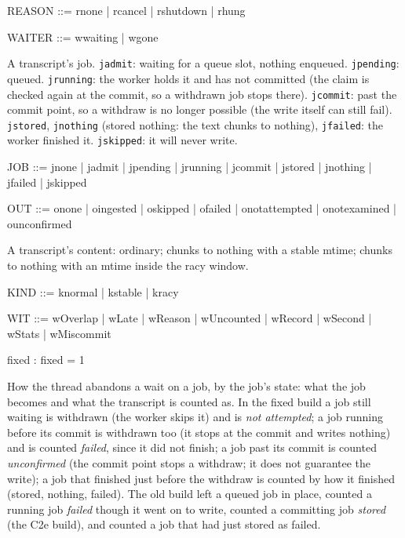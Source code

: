 \documentclass[a4paper,10pt,fleqn]{article}
\newcommand{\field}[1]{\texttt{#1}}
\begin{document}
\begin{zed}
REASON ::= rnone | rcancel | rshutdown | rhung
\end{zed}

\begin{zed}
WAITER ::= wwaiting | wgone
\end{zed}

A transcript's job. \field{jadmit}: waiting for a queue slot, nothing enqueued.
\field{jpending}: queued. \field{jrunning}: the worker holds it and has not
committed (the claim is checked again at the commit, so a withdrawn job stops
there). \field{jcommit}: past the commit point, so a withdraw is no longer possible
(the write itself can still fail).
\field{jstored}, \field{jnothing} (stored nothing: the text chunks to nothing),
\field{jfailed}: the worker finished it. \field{jskipped}: it will never write.

\begin{zed}
JOB ::= jnone | jadmit | jpending | jrunning
      | jcommit | jstored | jnothing | jfailed | jskipped
\end{zed}

\begin{zed}
OUT ::= onone | oingested | oskipped | ofailed | onotattempted | onotexamined
    | ounconfirmed
\end{zed}

A transcript's content: ordinary; chunks to nothing with a stable mtime; chunks
to nothing with an mtime inside the racy window.

\begin{zed}
KIND ::= knormal | kstable | kracy
\end{zed}

\begin{zed}
WIT ::= wOverlap | wLate | wReason | wUncounted | wRecord
    | wSecond | wStats | wMiscommit
\end{zed}

\begin{axdef}
fixed : \nat
\where
fixed = 1
\end{axdef}

How the thread abandons a wait on a job, by the job's state: what the job
becomes and what the transcript is counted as. In the fixed build a job still
waiting is withdrawn (the worker skips it) and is \emph{not attempted}; a job
running before its commit is withdrawn too (it stops at the commit and writes
nothing) and is counted \emph{failed}, since it did not finish; a job past its commit is counted
\emph{unconfirmed} (the commit point stops a withdraw; it does not guarantee the
write); a job that finished just before the withdraw is counted by how it
finished (stored, nothing, failed). The old build left a queued job in place,
counted a running job \emph{failed} though it went on to write, counted a
committing job \emph{stored} (the C2e build), and counted a job that had just
stored as failed.
\end{document}
